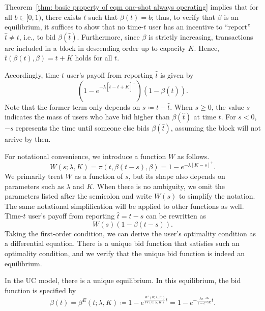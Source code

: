 \documentclass[12pt, letterpaper]{article}
\begin{document}
Theorem~\ref{thm: basic property of eqm one-shot always operating} implies that for all $b \in [0, 1)$, there exists $t$ such that $\beta(t) = b$; thus, to verify that $\beta$ is an equilibrium, it suffices to show that no time-$t$ user has an incentive to ``report'' $\hat{t} \neq t$, i.e., to bid $\beta(\hat{t})$. Furthermore, since $\beta$ is strictly increasing, transactions are included in a block in descending order up to capacity $K$. Hence, $\bar{t}(\beta(t), \beta) = t + K$ holds for all $t$.

Accordingly, time-$t$ user's payoff from reporting $\hat{t}$ is given by
\begin{equation}
    (1 - e^{-\lambda [\hat{t} - t + K]^+})(1 - \beta(\hat{t})).
\end{equation}
Note that the former term only depends on $s \coloneqq t - \hat{t}$. When $s\geq 0$, the value $s$ indicates the mass of users who have bid higher than $\beta(\hat{t})$ at time $t$. For $s < 0$, $-s$ represents the time until someone else bids $\beta(\hat{t})$, assuming the block will not arrive by then.

For notational convenience, we introduce a function $W$  as follows.
\begin{equation}\label{eq: W definition one-shot, always operating}
    W(s; \lambda, K) = \pi(t, \beta(t-s), \beta) = 1 - e^{-\lambda [K - s]^+}.
\end{equation}
We primarily treat $W$ as a function of $s$, but its shape also depends on parameters such as $\lambda$ and $K$. When there is no ambiguity, we omit the parameters listed after the semicolon and write $W(s)$ to simplify the notation. The same notational simplification will be applied to other functions as well.
Time-$t$ user's payoff from reporting $\hat{t} = t - s$ can be rewritten as
\begin{equation}
    W(s)(1 - \beta(t - s)).
\end{equation}
Taking the first-order condition, we can derive the user's optimality condition as a differential equation. 
There is a unique bid function that satisfies such an optimality condition, and we verify that the unique bid function is indeed an equilibrium.

\begin{thm}\label{thm: equilibrium closed form one-shot always operating}
In the UC model, there is a unique equilibrium. In this equilibrium, the bid function is specified by
\begin{equation}
    \beta(t) = \beta^E(t; \lambda, K) \coloneqq 1 - e^{\frac{W'(0; \lambda, K)}{W(0; \lambda, K)}t} = 1 - e^{-\frac{\lambda e^{- \lambda K}}{1 - e^{- \lambda K}}t}\label{eq: eqm bid function one-shot always operating}.
\end{equation}
\end{thm}
\end{document}
